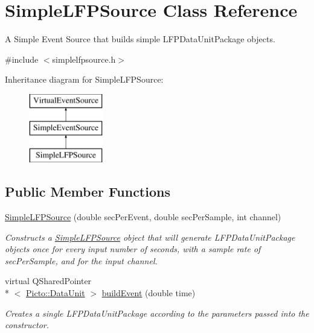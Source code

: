 \hypertarget{class_simple_l_f_p_source}{\section{Simple\-L\-F\-P\-Source Class Reference}
\label{class_simple_l_f_p_source}
}


A Simple Event Source that builds simple L\-F\-P\-Data\-Unit\-Package objects.  




{\ttfamily \#include $<$simplelfpsource.\-h$>$}

Inheritance diagram for Simple\-L\-F\-P\-Source\-:\begin{figure}[H]
\begin{center}
\leavevmode
\includegraphics[height=3.000000cm]{class_simple_l_f_p_source}
\end{center}
\end{figure}
\subsection*{Public Member Functions}
\begin{DoxyCompactItemize}
\item 
\hyperlink{class_simple_l_f_p_source_a6b5a13fc4d4c5a7784cc42d31e71abb3}{Simple\-L\-F\-P\-Source} (double sec\-Per\-Event, double sec\-Per\-Sample, int channel)
\begin{DoxyCompactList}\small\item\em Constructs a \hyperlink{class_simple_l_f_p_source}{Simple\-L\-F\-P\-Source} object that will generate L\-F\-P\-Data\-Unit\-Package objects once for every input number of seconds, with a sample rate of sec\-Per\-Sample, and for the input channel. \end{DoxyCompactList}\item 
\hypertarget{class_simple_l_f_p_source_a5ec1d12fd33fae9419f06b3b59cbcd6d}{virtual Q\-Shared\-Pointer\\*
$<$ \hyperlink{class_picto_1_1_data_unit}{Picto\-::\-Data\-Unit} $>$ \hyperlink{class_simple_l_f_p_source_a5ec1d12fd33fae9419f06b3b59cbcd6d}{build\-Event} (double time)}\label{class_simple_l_f_p_source_a5ec1d12fd33fae9419f06b3b59cbcd6d}

\begin{DoxyCompactList}\small\item\em Creates a single L\-F\-P\-Data\-Unit\-Package according to the parameters passed into the constructor. \end{DoxyCompactList}\end{DoxyCompactItemize}
